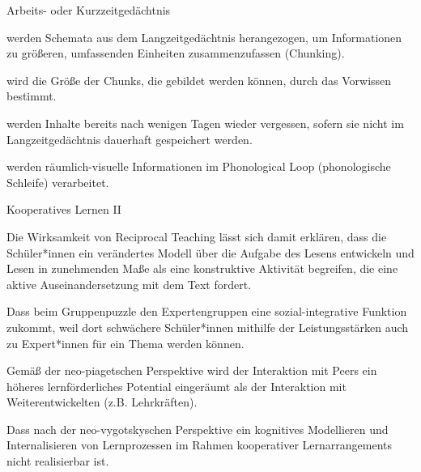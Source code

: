 \begin{multiple-choice}{Arbeits- oder Kurzzeitgedächtnis}
    \begin{answers}
        \item[\correct] werden Schemata aus dem Langzeitgedächtnis herangezogen, um Informationen zu größeren, umfassenden Einheiten zusammenzufassen (Chunking).
        \item[\correct] wird die Größe der Chunks, die gebildet werden können, durch das Vorwissen bestimmt.
        \item[\wrong] werden Inhalte bereits nach wenigen Tagen wieder vergessen, sofern sie nicht im Langzeitgedächtnis dauerhaft gespeichert werden.
        \item[\wrong] werden räumlich-visuelle Informationen im Phonological Loop (phonologische Schleife) verarbeitet.
    \end{answers}
\end{multiple-choice}

\begin{multiple-choice}{Kooperatives Lernen II}
    \begin{answers}
        \item[\correct] Die Wirksamkeit von Reciprocal Teaching lässt sich damit erklären, dass die Schüler*innen ein verändertes Modell über die Aufgabe des Lesens entwickeln und Lesen in zunehmenden Maße als eine konstruktive Aktivität begreifen, die eine aktive Auseinandersetzung mit dem Text fordert.
        \item[\correct] Dass beim Gruppenpuzzle den Expertengruppen eine sozial-integrative Funktion zukommt, weil dort schwächere Schüler*innen mithilfe der Leistungsstärken auch zu Expert*innen für ein Thema werden können.
        \item[\wrong] Gemäß der neo-piagetschen Perspektive wird der Interaktion mit Peers ein höheres lernförderliches Potential eingeräumt als der Interaktion mit Weiterentwickelten (z.B. Lehrkräften).
        \item[\wrong] Dass nach der neo-vygotskyschen Perspektive ein kognitives Modellieren und Internalisieren von Lernprozessen im Rahmen kooperativer Lernarrangements nicht realisierbar ist. 
    \end{answers}
\end{multiple-choice}

